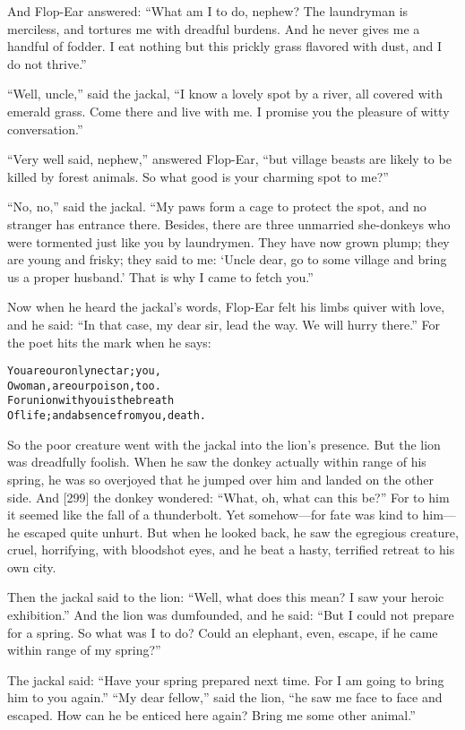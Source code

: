 \documentclass{article}
\renewenvironment{verbatim}{\begin{alltt}\normalfont\begin{centering}}{\end{centering}\end{alltt}}
\begin{document}
And Flop-Ear answered:
``What am I to do, nephew? The laundryman is merciless, and tortures me with dreadful burdens. And he never gives me a handful of fodder. I eat nothing but this prickly grass flavored with dust, and I do not thrive.''

``Well, uncle,'' said the jackal,
``I know a lovely spot by a river, all covered with emerald grass. Come there and live with me. I promise you the pleasure of witty conversation.''

``Very well said, nephew,'' answered Flop-Ear,
``but village beasts are likely to be killed by forest animals. So what good is your charming spot to me?''

``No, no,'' said the jackal.
``My paws form a cage to protect the spot, and no stranger has entrance there. Besides, there are three unmarried she-donkeys who were tormented just like you by laundrymen. They have now grown plump; they are young and frisky; they said to me: `Uncle dear, go to some village and bring us a proper husband.' That is why I came to fetch you.''

Now when he heard the jackal's words, Flop-Ear felt his limbs
quiver with love, and he said:
``In that case, my dear sir, lead the way. We will hurry there.''
For the poet hits the mark when he says:

\begin{verbatim}
You are our only nectar; you,
O woman, are our poison, too.
For union with you is the breath
Of life; and absence from you, death.
\end{verbatim}
So the poor creature went with the jackal into the lion's presence.
But the lion was dreadfully foolish. When he saw the donkey
actually within range of his spring, he was so overjoyed that he
jumped over him and landed on the other side. And [299] the donkey
wondered: ``What, oh, what can this be?'' For to him it seemed like
the fall of a thunderbolt. Yet somehow---for fate was kind to
him---he escaped quite unhurt. But when he looked back, he saw the
egregious creature, cruel, horrifying, with bloodshot eyes, and he
beat a hasty, terrified retreat to his own city.

Then the jackal said to the lion:
``Well, what does this mean? I saw your heroic exhibition.'' And
the lion was dumfounded, and he said:
``But I could not prepare for a spring. So what was I to do? Could an elephant, even, escape, if he came within range of my spring?''

The jackal said:
``Have your spring prepared next time. For I am going to bring him to you again.''
``My dear fellow,'' said the lion,
``he saw me face to face and escaped. How can he be enticed here again? Bring me some other animal.''
\end{document}
